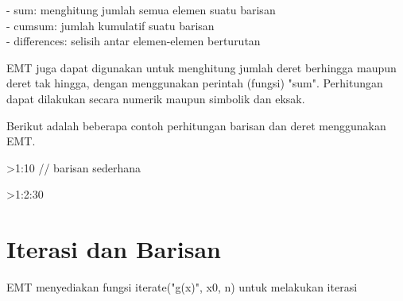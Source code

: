 \documentclass{article}
\newenvironment{eulernotebook}{\par}{\par}
\newcommand{\eulerheading}[1]{\section{#1}}
\newenvironment{eulercomment}{\par\medskip}{\par\medskip}
\begin{document}
\begin{eulernotebook}
\begin{eulercomment}
\begin{eulercomment}
\begin{eulercomment}
\begin{eulercomment}
\begin{eulercomment}
- sum: menghitung jumlah semua elemen suatu barisan\\
- cumsum: jumlah kumulatif suatu barisan\\
- differences: selisih antar elemen-elemen berturutan

EMT juga dapat digunakan untuk menghitung jumlah deret berhingga maupun deret tak hingga,
dengan menggunakan perintah (fungsi) "sum". Perhitungan dapat dilakukan secara numerik
maupun simbolik dan eksak.

Berikut adalah beberapa contoh perhitungan barisan dan deret menggunakan EMT.
\end{eulercomment}
\begin{eulerprompt}
>1:10 // barisan sederhana
\end{eulerprompt}
\begin{euleroutput}
  [1,  2,  3,  4,  5,  6,  7,  8,  9,  10]
\end{euleroutput}
\begin{eulerprompt}
>1:2:30
\end{eulerprompt}
\begin{euleroutput}
  [1,  3,  5,  7,  9,  11,  13,  15,  17,  19,  21,  23,  25,  27,  29]
\end{euleroutput}
\eulerheading{Iterasi dan Barisan}
\begin{eulercomment}
EMT menyediakan fungsi iterate("g(x)", x0, n) untuk melakukan iterasi


\end{eulercomment}
\end{eulercomment}
\end{eulercomment}
\end{eulercomment}
\end{eulercomment}
\end{eulernotebook}
\end{document}
